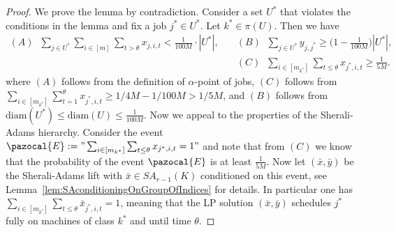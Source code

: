   
  \begin{proof}
  We prove the lemma by contradiction.  Consider a set $U^*$ that violates the conditions in the lemma and fix a job $j^* \in U^*$.
  Let $k^* \in \pi(U)$.
  Then we have
    \begin{align*}
  (A) \;\; \sum_{j \in U^*} \sum_{i \in [m]} \sum_{t > \theta} x_{j,i,t}  < \frac{1}{100M} \cdot |U^*|, \quad &(B) \;\; \sum_{j \in U^*} y_{j,j^*} \geq \Big(1-\frac{1}{100M}\Big)|U^*|,\\ 
   \quad  &(C) \;\; \sum_{i \in [m_{k^*}]} \sum_{t \leq \theta} x_{j^*,i,t} \geq \frac{1}{5M}.
    \end{align*}
  where $(A)$ follows from the definition of $\alpha$-point of jobs, $(C)$ follows from  $\sum_{i \in [m_{k^*}]} \sum_{t=1}^{\theta} x_{j^*,i,t} \geq 1/4M - 1/100M > 1/5 M$, and
  $(B)$ follows from $\textrm{diam}(U^*) \leq \textrm{diam}(U) \leq \frac{1}{100M}$.
  Now we appeal to the properties of the Sherali-Adams hierarchy.
  Consider the event $\pazocal{E} := "\sum_{i \in [m_{k^*}]} \sum_{t \leq \theta} x_{j^*,i,t} = 1"$
  and note that from $(C)$ we know that the probability of the event $\pazocal{E}$ is at least $\frac{1}{5M}$.
  Now let $(\bar{x},\bar{y})$ be the Sherali-Adams lift with $\bar{x} \in SA_{r-1}(K)$ conditioned on this event, see Lemma~\ref{lem:SAconditioningOnGroupOfIndices} for details.
  In particular one has $\sum_{i \in [m_{k^*}]} \sum_{t \leq \theta} \bar{x}_{j^*,i,t} = 1$, meaning that the LP solution
  $(\bar{x},\bar{y})$ schedules $j^*$ fully on machines of class $k^*$ and until time $\theta$. 
  

\end{proof}
